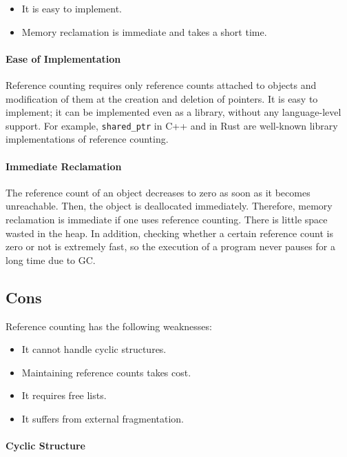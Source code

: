 \begin{itemize}
  \item It is easy to implement.
  \item Memory reclamation is immediate and takes a short time.
\end{itemize}

\paragraph{Ease of Implementation}

Reference counting requires only reference counts attached to objects
and modification of them at the creation and deletion of pointers. It is
easy to implement; it can be implemented even as a library, without any
language-level support. For example,
\verb!shared_ptr!
in C++ and
 in
Rust are well-known library implementations of reference counting.

\paragraph{Immediate Reclamation}

The reference count of an object decreases to zero as soon as it becomes
unreachable. Then, the object is deallocated immediately. Therefore, memory
reclamation is immediate if one uses reference counting. There is little space
wasted in the heap. In addition, checking whether a certain reference count is
zero or not is extremely fast, so the execution of a program never pauses for a
long time due to GC.

\subsection{Cons}

Reference counting has the following weaknesses:

\begin{itemize}
  \item It cannot handle cyclic structures.
  \item Maintaining reference counts takes cost.
  \item It requires free lists.
  \item It suffers from external fragmentation.
\end{itemize}

\paragraph{Cyclic Structure}

